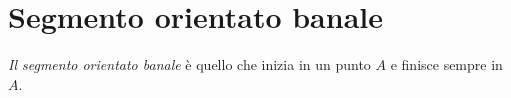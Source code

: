 \section{Segmento orientato banale}
\begin{definizione}
 \textit{Il segmento orientato banale} \`e quello che inizia in un punto $A$ e finisce sempre in $A$.
\end{definizione}
